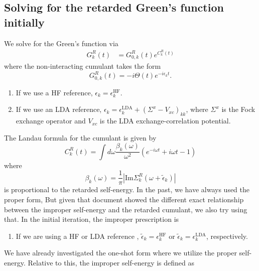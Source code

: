 \subsection{Solving for the retarded Green's function initially}
We solve for the Green's function via
\begin{align} G^{R}_{k}(t) &= G_{0,k}^R(t) e^{C_{k}^{R}(t)}
\label{eq:cumulant_G}\end{align}
where the non-interacting cumulant takes the form 
\begin{equation}
   G_{0,k}^R(t) = -i \Theta(t) e^{-i\epsilon_k t}.
\end{equation}
\begin{enumerate}
    \item If we use a HF reference, $\epsilon_k=\epsilon_k^{\text{HF}}$.
    \item If we use an LDA reference, $\epsilon_k = \epsilon_k^{\text{LDA}} + \left(\Sigma^x - V_{xc}\right)_{kk}$, where $\Sigma^x$ is the Fock exchange operator and $V_{xc}$ is the LDA exchange-correlation potential.
\end{enumerate}
The Landau formula for the cumulant is given by
\begin{equation}
C_{k}^R(t) = \int d\omega \frac{\beta_{k}(\omega)}{\omega^2} \left( e^{-i\omega t} + i\omega t - 1 \right)
\label{eq:cumulant_beta}
\end{equation}
where 
\begin{equation}
\beta_{k}(\omega) = \frac{1}{\pi} |\text{Im} \Sigma^R_{k}(\omega + \tilde{\epsilon}_k)|    
\end{equation}
is proportional to the retarded self-energy. In the past, we have always used the proper form, But given that document showed the different exact relationship between the improper self-energy and the retarded cumulant, we also try using that. In the initial iteration, the improper prescription is 

\begin{enumerate} 
    \item If we are using a HF or LDA reference , $\tilde{\epsilon}_k = \epsilon_k^{\text{HF}}$ or $\tilde{\epsilon}_k = \epsilon_k^{\text{LDA}}$, respectively.
\end{enumerate}
We have already investigated the one-shot form where we utilize the proper self-energy. Relative to this, the improper self-energy is defined as 


